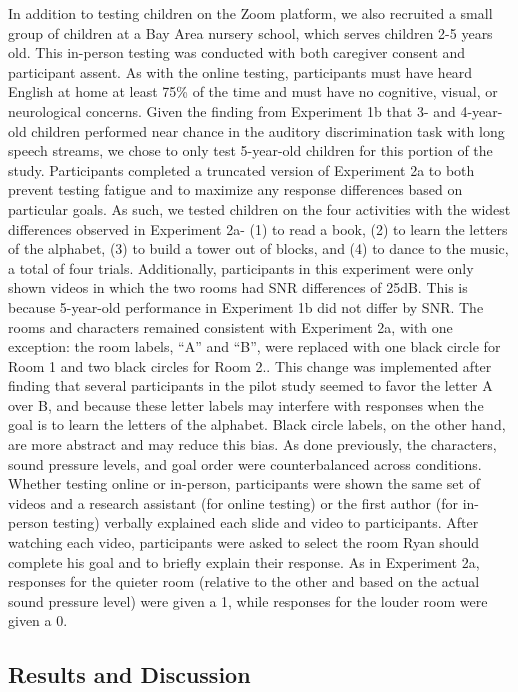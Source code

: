 \documentclass[10pt, letterpaper]{article}
\begin{document}
In addition to testing children on the Zoom platform, we also recruited
a small group of children at a Bay Area nursery school, which serves
children 2-5 years old. This in-person testing was conducted with both
caregiver consent and participant assent. As with the online testing,
participants must have heard English at home at least 75\% of the time
and must have no cognitive, visual, or neurological concerns. Given the
finding from Experiment 1b that 3- and 4-year-old children performed
near chance in the auditory discrimination task with long speech
streams, we chose to only test 5-year-old children for this portion of
the study. Participants completed a truncated version of Experiment 2a
to both prevent testing fatigue and to maximize any response differences
based on particular goals. As such, we tested children on the four
activities with the widest differences observed in Experiment 2a- (1) to
read a book, (2) to learn the letters of the alphabet, (3) to build a
tower out of blocks, and (4) to dance to the music, a total of four
trials. Additionally, participants in this experiment were only shown
videos in which the two rooms had SNR differences of 25dB. This is
because 5-year-old performance in Experiment 1b did not differ by SNR.
The rooms and characters remained consistent with Experiment 2a, with
one exception: the room labels, ``A'' and ``B'', were replaced with one
black circle for Room 1 and two black circles for Room 2.. This change
was implemented after finding that several participants in the pilot
study seemed to favor the letter A over B, and because these letter
labels may interfere with responses when the goal is to learn the
letters of the alphabet. Black circle labels, on the other hand, are
more abstract and may reduce this bias. As done previously, the
characters, sound pressure levels, and goal order were counterbalanced
across conditions. Whether testing online or in-person, participants
were shown the same set of videos and a research assistant (for online
testing) or the first author (for in-person testing) verbally explained
each slide and video to participants. After watching each video,
participants were asked to select the room Ryan should complete his goal
and to briefly explain their response. As in Experiment 2a, responses
for the quieter room (relative to the other and based on the actual
sound pressure level) were given a 1, while responses for the louder
room were given a 0.

\hypertarget{results-and-discussion-3}{%
\subsection{\texorpdfstring{\textbf{Results and
Discussion}}{Results and Discussion}}\label{results-and-discussion-3}}
\end{document}
